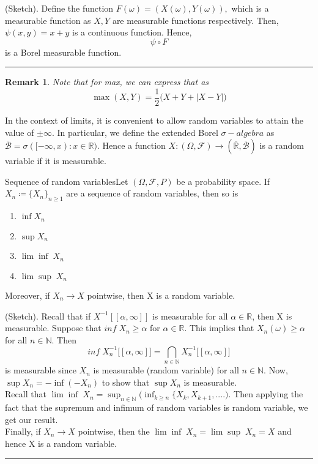 \documentclass[twoside]{article}
\newtheorem{remark}[theorem]{Remark}
\newenvironment{proof}{{\bf Proof:}}{\hfill\rule{2mm}{2mm}}
\newcommand{\sigmalgebra}{\mathcal{F}}
\newcommand{\borelsigmaalgebra}{\mathcal{B}}
\newcommand{\sa}{\sigma-algebra}
\begin{document}
\begin{proof}(Sketch). Define the function $F(\omega) = (X(\omega), Y(\omega)),$ which is a measurable function as $X, Y$ are measurable functions respectively. Then, $\psi(x,y) = x+ y$ is a continuous function. Hence, 
$$
\psi \circ F
$$
is a Borel measurable function.
\end{proof}

\begin{remark}Note that for max, we can express that as 
$$
\max(X,Y) = \frac{1}{2}\bigg(X + Y + |X - Y|\bigg)
$$
\end{remark}


In the context of limits, it is convenient to allow random variables to attain the value of $\pm \infty$. In particular, we define the extended Borel $\sa$ as $\overline{\borelsigmaalgebra} = \sigma([-\infty,x): x \in \mathbb{R}).$ Hence a function $X: (\Omega, \sigmalgebra) \rightarrow (\overline{\mathbb{R}}, \overline{\borelsigmaalgebra})$ is a random variable if it is measurable.

\begin{theorem_exam}{Sequence of random variables}{}Let $(\Omega, \mathcal{F}, P)$ be a probability space. If $X_n \coloneqq \{X_n\}_{n \geq 1}$ are a sequence of random variables, then so is 
\begin{enumerate}
\item $\inf X_n$
\item $\sup X_n$
\item $\lim \inf\;X_n$
\item $\lim \sup\;X_n$
\end{enumerate}
Moreover, if $X_n \rightarrow X$ pointwise, then X is a random variable.
\end{theorem_exam}

\begin{proof}(Sketch). Recall that if $X^{-1}[[\alpha, \infty]]$ is measurable for all $\alpha \in \mathbb{R}$, then X is measurable. Suppose that $inf\;X_n \geq \alpha$ for $\alpha \in \mathbb{R}$. This implies that $X_n(\omega) \geq \alpha$ for all $n \in \mathbb{N}.$ Then 
$$
inf\;X_n^{-1}\bigg[[\alpha, \infty] \bigg] = \bigcap_{n \in \mathbb{N}}X_{n}^{-1}\bigg[[\alpha, \infty] \bigg]
$$
is measurable since $X_n$ is measurable (random variable) for all $n \in \mathbb{N}$. Now, $\sup X_n = -\inf (-X_n)$ to show that $\sup X_n$ is measurable.\\ Recall that $\lim \inf\;X_n = \sup_{n \in \mathbb{N}}\bigg(\inf_{k \geq n}\{X_k, X_{k+1}, ....\bigg)$. Then applying the fact that the supremum and infimum of random variables is random variable, we get our result.\\
Finally, if $X_n \rightarrow X$ pointwise, then the $\lim \inf\;X_n = \lim \sup\;X_n = X$ and hence X is a random variable.
\end{proof}
\end{document}
